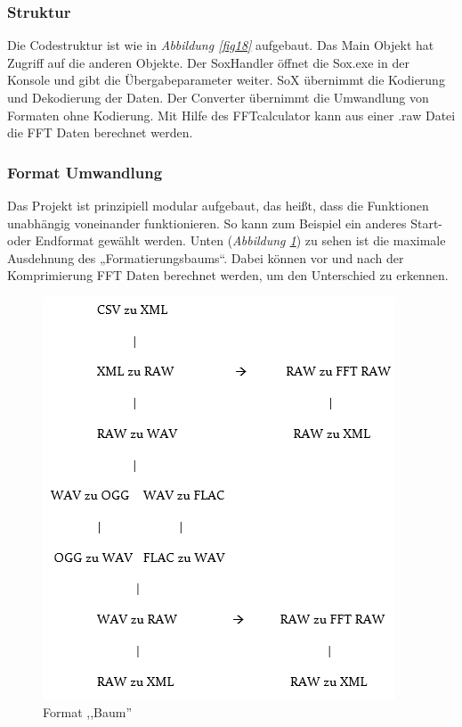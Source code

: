 \documentclass{article}
\begin{document}
		\subsubsection{Struktur}
			Die Codestruktur ist wie in \textit{Abbildung \ref{fig18}} aufgebaut. Das Main Objekt hat Zugriff auf die anderen Objekte. Der SoxHandler öffnet die Sox.exe in der Konsole und gibt die Übergabeparameter weiter. SoX übernimmt die Kodierung und Dekodierung der Daten. Der Converter übernimmt die Umwandlung von Formaten ohne Kodierung. Mit Hilfe des FFTcalculator kann aus einer .raw Datei die FFT Daten berechnet werden.
			
			
		\subsubsection{Format Umwandlung}

			Das Projekt ist prinzipiell modular aufgebaut, das heißt, dass die Funktionen unabhängig voneinander funktionieren. So kann zum Beispiel ein anderes Start- oder Endformat gewählt werden. Unten (\textit{Abbildung \ref{fig19}}) zu sehen ist die maximale Ausdehnung des „Formatierungsbaums“. Dabei können vor und nach der Komprimierung FFT Daten berechnet werden, um den Unterschied zu erkennen.\\
			
			\begin{figure}[h]
				\includegraphics[scale=0.7]{Bilder/Capture2.PNG}
				\centering
				\vspace{0 cm}
				\caption{Format ,,Baum''}
				\label{fig19}	
			\end{figure}
				
\end{document}
